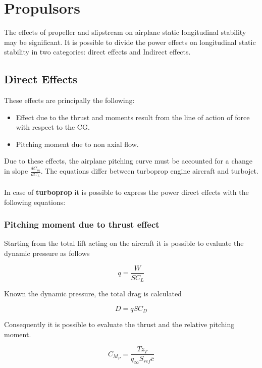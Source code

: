 \section{Propulsors}

The effects of propeller and slipstream on airplane static longitudinal stability may be significant. It is possible to divide the power effects on longitudinal static stability in two categories: direct effects and
Indirect effects.
\subsection{Direct Effects}
 These effects are principally the following:
\begin{itemize}
\item  Effect due to the thrust and moments result from the line of action of force with respect to the CG.
\item Pitching moment due to non axial flow.
\end{itemize}

Due to these effects, the airplane pitching curve must be accounted for a change in slope $\frac{dC_m}{dC_L}$. The equations differ between turboprop engine aircraft and turbojet.\\
\\
 In case of {\bfseries turboprop} it is possible to express the power direct effects with the following equations:
\subsubsection{Pitching moment due to thrust effect}

Starting from the total lift acting on the aircraft it is possible to evaluate the dynamic pressure as follows

\begin{equation}
q = \frac{W}{S C_L}
\end{equation}

Known the dynamic pressure, the total drag is calculated

\begin{equation}
D = q S C_D
\end{equation}

Consequently it is possible to evaluate the thrust and the relative pitching moment.

\begin{equation}
C_{M_P} = \frac{T z_T}{q_{\infty} S_{ref} \bar{c}}
\end{equation}

